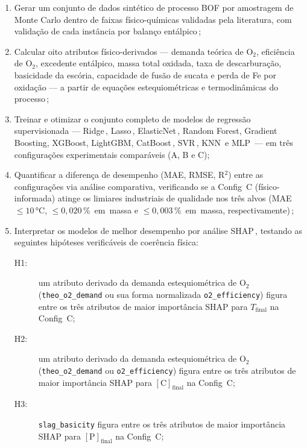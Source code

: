 \begin{enumerate}
  \item Gerar um conjunto de dados sintético de processo BOF por amostragem de Monte Carlo dentro de faixas físico-químicas validadas pela literatura, com validação de cada instância por balanço entálpico\,\cite{buggineni2024synthetic,xia2024dmpinn};
  \item Calcular oito atributos físico-derivados — demanda teórica de O$_2$, eficiência de O$_2$, excedente entálpico, massa total oxidada, taxa de descarburação, basicidade da escória, capacidade de fusão de sucata e perda de Fe por oxidação — a partir de equações estequiométricas e termodinâmicas do processo\,\cite{chattopadhyay2022hybrid,shao2024hybrid};
  \item Treinar e otimizar o conjunto completo de modelos de regressão supervisionada — Ridge\,\cite{hoerl1970ridge}, Lasso\,\cite{tibshirani1996regression}, ElasticNet\,\cite{zou2005regularization}, Random Forest, Gradient Boosting, XGBoost, LightGBM, CatBoost\,\cite{zhou2024bof}, SVR\,\cite{widodo2007svm}, KNN\,\cite{ding2011knnimpute} e MLP\,\cite{goodfellow2016deep} — em três configurações experimentais comparáveis (A, B e C);
  \item Quantificar a diferença de desempenho (MAE, RMSE, R$^2$) entre as configurações via análise comparativa, verificando se a Config~C (físico-informada) atinge os limiares industriais de qualidade nos três alvos (MAE $\leq 10$\,°C, $\leq 0{,}020$\,\%~em~massa e $\leq 0{,}003$\,\%~em~massa, respectivamente)\,\cite{zhou2024bof,bae2020bof};
  \item Interpretar os modelos de melhor desempenho por análise SHAP\,\cite{lundberg2017unified,manojlovic2022eaf}, testando as seguintes hipóteses verificáveis de coerência física:
  \begin{description}
    \item[H1:] um atributo derivado da demanda estequiométrica de O$_2$ (\texttt{theo\_o2\_demand} ou sua forma normalizada \texttt{o2\_efficiency}) figura entre os três atributos de maior importância SHAP para $T_\text{final}$ na Config~C;
    \item[H2:] um atributo derivado da demanda estequiométrica de O$_2$ (\texttt{theo\_o2\_demand} ou \texttt{o2\_efficiency}) figura entre os três atributos de maior importância SHAP para $[\text{C}]_\text{final}$ na Config~C;
    \item[H3:] \texttt{slag\_basicity} figura entre os três atributos de maior importância SHAP para $[\text{P}]_\text{final}$ na Config~C;

\end{description}
\end{enumerate}
